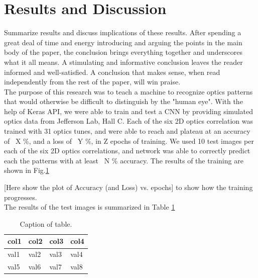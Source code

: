 \documentclass[conference]{IEEEtran}
\begin{document}
\section{Results and Discussion}
Summarize results and discuss implications of these results. After spending a great deal of time and energy introducing and arguing the points in the main body of the paper,
the conclusion brings everything together and underscores what it all means. A stimulating and informative conclusion
leaves the reader informed and well-satisfied. A conclusion that makes sense, when read independently from the rest of
the paper, will win praise. \\
\indent The purpose of this research was to teach a machine to recognize optics patterns that would otherwise be
difficult to distinguish by the "human eye". With the help of Keras API, we were able to train and test a CNN
by providing simulated optics data from Jefferson Lab, Hall C.  Each of the six 2D optics correlation was trained with
31 optics tunes, and were able to reach and plateau at an accuracy of ~X \%, and a loss of ~Y \%, in Z epochs of training.
We used 10 test images per each of the six 2D optics correlations, and network was able to correctly predict
each the patterns with at least ~N \% accuracy. The results of the training are shown in Fig.\ref{}

[Here show the plot of Accuracy (and Loss) vs. epochs] to show how the training progresses. \\

The results of the test images is summarized in Table \ref{tab:results}
\begin{table}[h]
	\begin{center}
		\begin{tabular}{llll} %
                  \hline
                  col1 & col2 & col3 & col4 \\ \hline \hline
	          val1 & val2 & val3 & val4 \\
                  val5 & val6 & val7 & val8 \\
		  \hline 
		\end{tabular}
	\end{center}
	\caption{Caption of table.}
	\label{tab:results}
\end{table}


   

\end{document}
